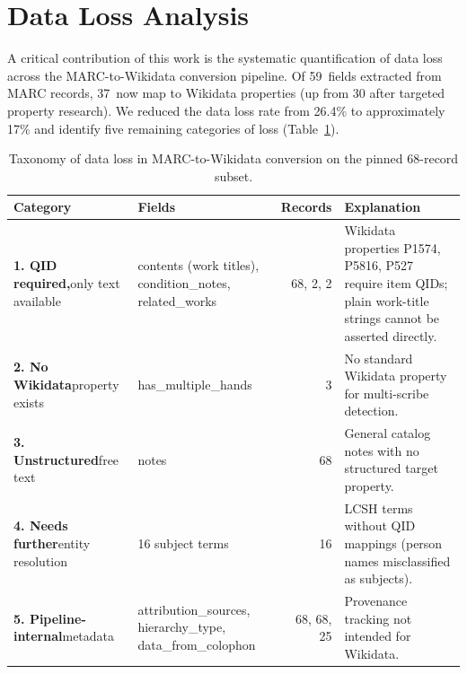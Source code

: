 \documentclass[Afour,sageh,times]{sagej}
\begin{document}
\section{Data Loss Analysis}
\label{sec:data-loss}

A critical contribution of this work is the systematic quantification of data loss across the MARC-to-Wikidata conversion pipeline. Of 59~fields extracted from MARC records, 37~now map to Wikidata properties (up from 30 after targeted property research). We reduced the data loss rate from 26.4\% to approximately 17\% and identify five remaining categories of loss (Table~\ref{tab:data-loss}).

\begin{table}[t]
\caption{Taxonomy of data loss in MARC-to-Wikidata conversion on the pinned 68-record subset.}
\label{tab:data-loss}
\centering
\small
\begin{tabular}{p{3.5cm}p{4cm}rp{5.5cm}}
\toprule
\textbf{Category} & \textbf{Fields} & \textbf{Records} & \textbf{Explanation} \\
\midrule
\textbf{1. QID required,}\newline only text available
  & contents (work titles), condition\_notes, related\_works
  & 68, 2, 2
  & Wikidata properties P1574, P5816, P527 require item QIDs; plain work-title strings cannot be asserted directly. \\
\addlinespace
\textbf{2. No Wikidata}\newline property exists
  & has\_multiple\_hands
  & 3
  & No standard Wikidata property for multi-scribe detection. \\
\addlinespace
\textbf{3. Unstructured}\newline free text
  & notes
  & 68
  & General catalog notes with no structured target property. \\
\addlinespace
\textbf{4. Needs further}\newline entity resolution
  & 16 subject terms
  & 16
  & LCSH terms without QID mappings (person names misclassified as subjects). \\
\addlinespace
\textbf{5. Pipeline-internal}\newline metadata
  & attribution\_sources, hierarchy\_type, data\_from\_colophon
  & 68, 68, 25
  & Provenance tracking not intended for Wikidata. \\
\bottomrule
\end{tabular}
\end{table}
\end{document}
